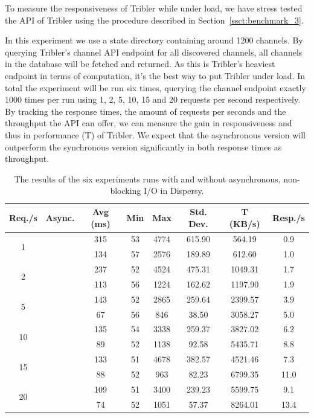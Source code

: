 To measure the responsiveness of Tribler while under load, we have stress tested the API of Tribler using the procedure described in Section~\ref{ssct:benchmark_3}.

In this experiment we use a state directory containing around 1200 channels.
By querying Tribler's channel API endpoint for all discovered channels, all channels in the database will be fetched and returned.
As this is Tribler's heaviest endpoint in terms of computation, it's the best way to put Tribler under load.
In total the experiment will be run six times, querying the channel endpoint exactly 1000 times per run using 1, 2, 5, 10, 15 and 20 requests per second respectively.
By tracking the response times, the amount of requests per seconds and the throughput the API can offer, we can measure the gain in responsiveness and thus in performance (T) of Tribler.
We expect that the asynchronous version will outperform the synchronous version significantly in both response times as throughput.

\begin{table}[!h]
	\centering
	\caption{The results of the six experiments runs with and without asynchronous, non-blocking I/O in Dispersy.}
	\label{table:responsiveness_tribler_load}
	\begin{tabular}{|c|c|c|c|c|c|c|c|}
		\hline
		Req./s              & Async. & Avg (ms) & Min & Max & Std. Dev. & T (KB/s) & Resp./s \\ \hline
		\multirow{2}{*}{1}  & \xmark      & 315 & 53  & 4774 & 615.90    & 564.19            & 0.9         \\ \cline{2-8} 
		& \cmark      & 134 & 57  & 2576 & 189.89    & 612.60            & 1.0         \\ \hline
		\multirow{2}{*}{2}  & \xmark       & 237 & 52  & 4524 & 475.31    & 1049.31           & 1.7         \\ \cline{2-8} 
		& \cmark      & 113 & 56  & 1224 & 162.62    & 1197.90           & 1.9         \\ \hline
		\multirow{2}{*}{5}  & \xmark       & 143 & 52  & 2865 & 259.64    & 2399.57           & 3.9         \\ \cline{2-8} 
		& \cmark      & 67  & 56  & 846  & 38.50     & 3058.27           & 5.0         \\ \hline
		\multirow{2}{*}{10} & \xmark       & 135 & 54  & 3338 & 259.37    & 3827.02           & 6.2         \\ \cline{2-8} 
		& \cmark      & 89  & 52  & 1138 & 92.58     & 5435.71           & 8.8         \\ \hline
		\multirow{2}{*}{15} & \xmark       & 133 & 51  & 4678 & 382.57    & 4521.46           & 7.3         \\ \cline{2-8} 
		& \cmark      & 88  & 52  & 963  & 82.23     & 6799.35           & 11.0        \\ \hline
		\multirow{2}{*}{20} & \xmark       & 109 & 51  & 3400 & 239.23    & 5599.75           & 9.1         \\ \cline{2-8} 
		& \cmark      & 74  & 52  & 1051 & 57.37     & 8264.01           & 13.4        \\ \hline
	\end{tabular}
\end{table}

